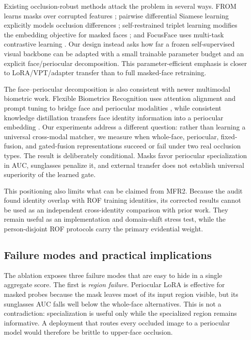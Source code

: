 ﻿\documentclass[10pt,journal,compsoc]{IEEEtran}
\begin{document}
Existing occlusion-robust methods attack the problem in several ways. FROM learns masks over corrupted features \cite{from2022}; pairwise differential Siamese learning explicitly models occlusion differences \cite{masklearn}; self-restrained triplet learning modifies the embedding objective for masked faces \cite{umr}; and FocusFace uses multi-task contrastive learning \cite{focusface}. Our design instead asks how far a frozen self-supervised visual backbone can be adapted with a small trainable parameter budget and an explicit face/periocular decomposition. This parameter-efficient emphasis is closer to LoRA/VPT/adapter transfer \cite{lora,vpt,adaptformer} than to full masked-face retraining.

The face--periocular decomposition is also consistent with newer multimodal biometric work. Flexible Biometrics Recognition uses attention alignment and prompt tuning to bridge face and periocular modalities \cite{fbr2024}, while consistent knowledge distillation transfers face identity information into a periocular embedding \cite{ckd2024}. Our experiments address a different question: rather than learning a universal cross-modal matcher, we measure when whole-face, periocular, fixed-fusion, and gated-fusion representations succeed or fail under two real occlusion types. The result is deliberately conditional. Masks favor periocular specialization in AUC, sunglasses penalize it, and external transfer does not establish universal superiority of the learned gate.

This positioning also limits what can be claimed from MFR2. Because the audit found identity overlap with ROF training identities, its corrected results cannot be used as an independent cross-identity comparison with prior work. They remain useful as an implementation and domain-shift stress test, while the person-disjoint ROF protocols carry the primary evidential weight.

\subsection{Failure modes and practical implications}
The ablation exposes three failure modes that are easy to hide in a single aggregate score. The first is \emph{region failure}. Periocular LoRA is effective for masked probes because the mask leaves most of its input region visible, but its sunglasses AUC falls well below the whole-face alternatives. This is not a contradiction: specialization is useful only while the specialized region remains informative. A deployment that routes every occluded image to a periocular model would therefore be brittle to upper-face occlusion.
\end{document}
